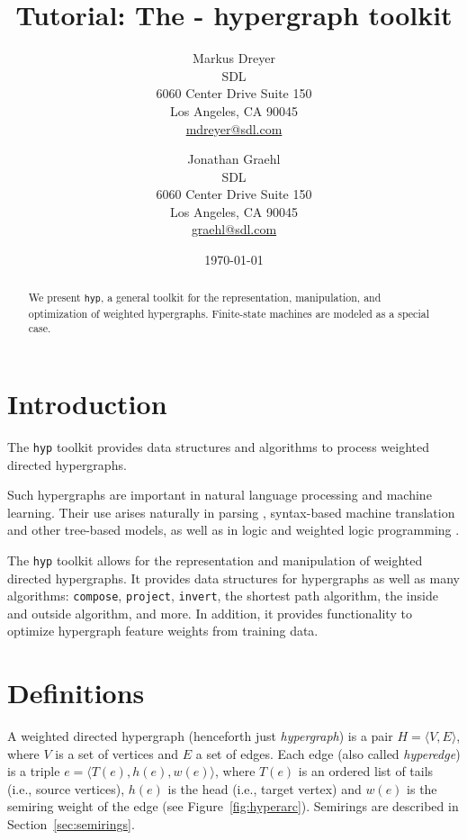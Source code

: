 \documentclass[12pt]{article}
\title{Tutorial: The \hyp{} hypergraph toolkit}
\author{
  Markus Dreyer\\
  SDL\\
  6060 Center Drive Suite 150\\
  Los Angeles, CA 90045\\
  \url{mdreyer@sdl.com}
  \and
  Jonathan Graehl\\
  SDL\\
  6060 Center Drive Suite 150\\
  Los Angeles, CA 90045\\
  \url{graehl@sdl.com}
}
\date{\today}
\newcommand{\hyp}{\texttt{hyp}\xspace}
\newcommand{\code}[1]{\texttt{#1}}
\newcommand{\secref}[1]{Section~\ref{sec:#1}}
\newcommand{\figref}[1]{Figure~\ref{fig:#1}}
\let\cite\citep    %
\begin{document}
\maketitle

\begin{abstract}
  We present \hyp, a general toolkit for the representation,
  manipulation, and optimization of weighted hypergraphs. Finite-state
  machines are modeled as a special case.
\end{abstract}

\tableofcontents

\section{Introduction}

The \hyp{} toolkit provides data structures and algorithms to process
weighted directed hypergraphs.

Such hypergraphs are important in natural language processing and
machine learning. Their use arises naturally in parsing
\cite{klein_parsing_2005, huang_better_2005}, syntax-based machine
translation and other tree-based models, as well as in logic
\cite{gallo_directed_1993} and weighted logic programming
\cite{eisner_dyna:_2011}.

The \hyp{} toolkit allows for the representation and manipulation of
weighted directed hypergraphs. It provides data structures for
hypergraphs as well as many algorithms: \code{compose},
\code{project}, \code{invert}, the shortest path algorithm, the inside
and outside algorithm, and more. In addition, it provides
functionality to optimize hypergraph feature weights from training
data.

\section{Definitions}\label{sec:definitions}
A weighted directed hypergraph (henceforth just \textit{hypergraph})
is a pair $H=\langle V,E\rangle$, where $V$ is a set of vertices and
$E$ a set of edges. Each edge (also called \textit{hyperedge}) is a
triple $e=\langle T(e), h(e), w(e) \rangle$, where $T(e)$ is an
ordered list of tails (i.e., source vertices), $h(e)$ is the head
(i.e., target vertex) and $w(e)$ is the semiring weight of the edge
(see \figref{hyperarc}). Semirings are described in
\secref{semirings}.
\end{document}

